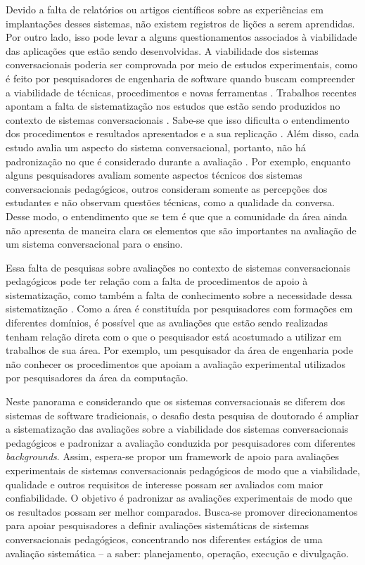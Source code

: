 Devido a falta de relatórios ou artigos científicos sobre as experiências em implantações desses sistemas, não existem registros de lições a serem aprendidas. Por outro lado, isso pode levar a alguns questionamentos associados à viabilidade das aplicações que estão sendo desenvolvidas. A viabilidade dos sistemas conversacionais poderia ser comprovada por meio de estudos experimentais, como é feito por pesquisadores de engenharia de software quando buscam compreender a viabilidade de técnicas, procedimentos e novas ferramentas \cite{Wohlin}. Trabalhos recentes apontam a falta de sistematização nos estudos que estão sendo produzidos no contexto de sistemas conversacionais \cite{winkler2018}. Sabe-se que isso dificulta o entendimento dos procedimentos e resultados apresentados e a sua replicação \cite{de2016experimentation}. Além disso, cada estudo avalia um aspecto do sistema conversacional, portanto, não há padronização no que é considerado durante a avaliação \cite{hobert2019}. Por exemplo, enquanto alguns pesquisadores avaliam somente aspectos técnicos dos sistemas conversacionais pedagógicos, outros consideram somente as percepções dos estudantes e não observam questões técnicas, como a qualidade da conversa. Desse modo, o entendimento que se tem é que que a comunidade da área ainda não apresenta de maneira clara os elementos que são importantes na avaliação de um sistema conversacional para o ensino.

Essa falta de pesquisas sobre avaliações no contexto de sistemas conversacionais pedagógicos pode ter relação com a falta de procedimentos de apoio à sistematização, como também a falta de conhecimento sobre a necessidade dessa sistematização \cite{io2017}. Como a área é constituída por pesquisadores com formações em diferentes domínios, é possível que as avaliações que estão sendo realizadas tenham relação direta com o que o pesquisador está acostumado a utilizar em trabalhos de sua área. Por exemplo, um pesquisador da área de engenharia pode não conhecer os procedimentos que apoiam a avaliação experimental utilizados por pesquisadores da área da computação.

Neste panorama e considerando que os sistemas conversacionais se diferem dos sistemas de software tradicionais, o desafio desta pesquisa de doutorado é ampliar a sistematização das avaliações sobre a viabilidade dos sistemas conversacionais pedagógicos e padronizar a avaliação conduzida por pesquisadores com diferentes \textit{backgrounds}. Assim, espera-se propor um framework de apoio para avaliações experimentais de sistemas conversacionais pedagógicos de modo que a viabilidade, qualidade e outros requisitos de interesse possam ser avaliados com maior confiabilidade. O objetivo é padronizar as avaliações experimentais de modo que os resultados possam ser melhor comparados. Busca-se promover direcionamentos para apoiar pesquisadores a definir avaliações sistemáticas de sistemas conversacionais pedagógicos, concentrando nos diferentes estágios de uma avaliação sistemática – a saber: planejamento, operação, execução e divulgação.


